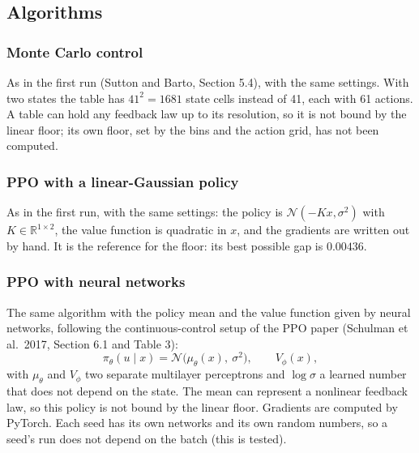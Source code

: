 \documentclass[11pt]{article}
\begin{document}
\subsection{Algorithms}
\label{sec:algorithms}

\subsubsection{Monte Carlo control}

As in the first run (Sutton and Barto, Section 5.4), with the same settings. With two states the
table has $41^2 = 1681$ state cells instead of 41, each with 61 actions. A table can hold any
feedback law up to its resolution, so it is not bound by the linear floor; its own floor, set by the
bins and the action grid, has not been computed.

\subsubsection{PPO with a linear-Gaussian policy}

As in the first run, with the same settings: the policy is $\mathcal{N}(-Kx, \sigma^2)$ with
$K \in \mathbb{R}^{1 \times 2}$, the value function is quadratic in $x$, and the gradients are written
out by hand. It is the reference for the floor: its best possible gap is $0.00436$.

\subsubsection{PPO with neural networks}

The same algorithm with the policy mean and the value function given by neural networks, following
the continuous-control setup of the PPO paper (Schulman et al.\ 2017, Section 6.1 and Table 3):
\[
  \pi_\theta(u \mid x) = \mathcal{N}\big(\mu_\theta(x),\ \sigma^2\big), \qquad V_\phi(x),
\]
with $\mu_\theta$ and $V_\phi$ two separate multilayer perceptrons and $\log \sigma$ a learned number
that does not depend on the state. The mean can represent a nonlinear feedback law, so this policy is
not bound by the linear floor. Gradients are computed by PyTorch. Each seed has its own networks and
its own random numbers, so a seed's run does not depend on the batch (this is tested).
\end{document}
